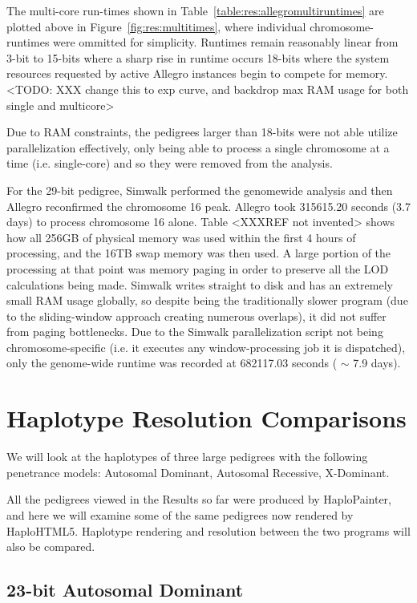 The multi-core run-times shown in Table~\ref{table:res:allegromultiruntimes} are plotted above in Figure~\ref{fig:res:multitimes}, where individual chromosome-runtimes were ommitted for simplicity.   Runtimes remain reasonably linear from 3-bit to 15-bits where a sharp rise in runtime occurs 18-bits where the system resources requested by active Allegro instances begin to compete for memory.
<TODO: XXX change this to exp curve, and backdrop max RAM usage  for both single and multicore>

Due to RAM constraints, the pedigrees larger than 18-bits were not able utilize parallelization effectively, only being able to process a single chromosome at a time (i.e. single-core) and so they were removed from the analysis.

For the 29-bit pedigree, Simwalk performed the genomewide analysis and then Allegro reconfirmed the chromosome 16 peak. Allegro took 315615.20 seconds (3.7 days) to process chromosome 16 alone. Table <XXXREF not invented> shows how all 256GB of physical memory was used within the first 4 hours of processing, and the 16TB swap memory was then used. A large portion of the processing at that point was memory paging in order to preserve all the LOD calculations being made.  Simwalk writes straight to disk and has an extremely small RAM usage globally, so despite being the traditionally slower program (due to the sliding-window approach creating numerous overlaps), it did not suffer from paging bottlenecks. Due to the Simwalk parallelization script not being chromosome-specific (i.e. it executes any window-processing job it is dispatched), only the genome-wide runtime was recorded at 682117.03 seconds ( $\sim$ 7.9 days).



\section{Haplotype Resolution Comparisons}

We will look at the haplotypes of three large pedigrees with the following penetrance models: Autosomal Dominant, Autosomal Recessive, X-Dominant.

All the pedigrees viewed in the Results so far were produced by HaploPainter, and here we will examine some of the same pedigrees now rendered by HaploHTML5. Haplotype rendering and resolution between the two programs will also be compared.

\subsection{23-bit Autosomal Dominant}

